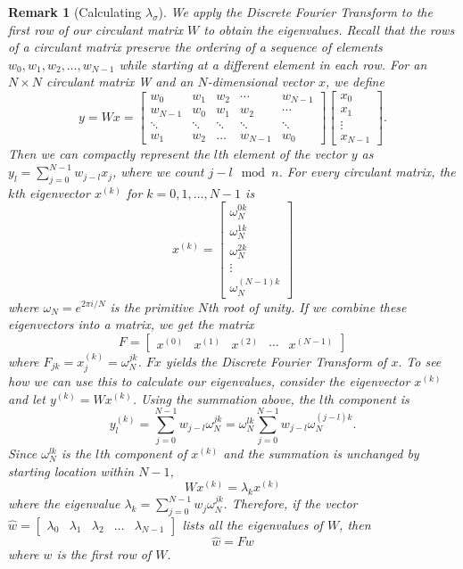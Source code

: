 \documentclass[journal,twoside,web]{ieeecolor_no_firstpage_logo}
\newtheorem{remark}{Remark}
\begin{document}
\begin{remark} [Calculating $\lambda_\sigma$]
We apply the Discrete Fourier Transform to the first row of our circulant matrix $W$ to obtain the eigenvalues. Recall that the rows of a circulant matrix preserve the ordering of a sequence of elements $w_0,w_1,w_2,\dots,w_{N-1}$ while starting at a different element in each row. For an $N\times N$ circulant matrix W and an $N$-dimensional vector $x$, we define 
$$
y = Wx = \begin{bmatrix}
    w_0 & w_1 & w_2 & \dotsi & w_{N-1} \\
    w_{N-1} & w_0 & w_1 & w_2 & \dotsi \\
    \ddots & \ddots & \ddots & \ddots &\ddots \\
    w_1 & w_2 & \dots & w_{N-1} & w_0
\end{bmatrix} \begin{bmatrix}
    x_0 \\ x_1 \\ \vdots \\ x_{N-1}
\end{bmatrix}.
$$
Then we can compactly represent the $l$th element of the vector $y$ as $y_l = \sum_{j = 0}^{N-1}w_{j-l}x_j$, where we count $j - l \mod{n}$. For every circulant matrix, the $k$th eigenvector $x^{(k)}$ for $k = 0, 1, \dots, N-1$ is
$$
x^{(k)} = \begin{bmatrix}
    \omega_N^{0k} \\ \omega_N^{1k}\\ \omega_N^{2k} \\ \vdots \\ \omega_N^{(N-1)k}
\end{bmatrix}
$$
where $\omega_N = e^{{2\pi i}/N}$ is the primitive $N$th root of unity. If we combine these eigenvectors into a matrix, we get the matrix
$$
F = \begin{bmatrix}
    x^{(0)} & x^{(1)} & x^{(2)} & \cdots  & x^{(N-1)}
\end{bmatrix}
$$
where $F_{jk} = x_j^{(k)} = \omega_N^{jk}$. $Fx$ yields the Discrete Fourier Transform of $x.$ To see how we can use this to calculate our eigenvalues, consider the eigenvector $x^{(k)}$ and let $y^{(k)} = Wx^{(k)}$. Using the summation above, the $l$th component is 
$$y^{(k)}_l = \sum_{j = 0}^{N-1} w_{j-l}\omega_N^{jk} = \omega_N^{lk} \sum_{j = 0}^{N-1} w_{j-l}\omega_N^{(j-l)k}.$$
Since $\omega_N^{lk}$ is the $l$th component of $x^{(k)}$ and the summation is unchanged by starting location within $N-1$, 
$$
Wx^{(k)} = \lambda_k x^{(k)}
$$
where the eigenvalue $\lambda_k = \sum_{j = 0}^{N-1}w_j\omega_N^{jk}.$ Therefore, if the vector $\hat{w} = \begin{bmatrix}
    \lambda_0 & \lambda_1 & \lambda_2 & \dots  & \lambda_{N-1}
\end{bmatrix}$
lists all the eigenvalues of $W$, then 
$$\hat{w} = Fw$$ where $w$ is the first row of $W.$
\end{remark}
\end{document}
